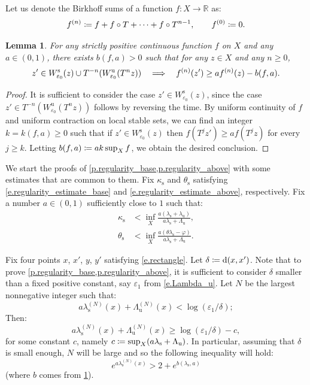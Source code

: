 \documentclass[JEP,XML,SOM,Unicode]{cedram}
\def\vcentcolon{\mathrel{\mathop\ordinarycolon}}
\providecommand\ordinarycolon{:}
\providecommand*\coloneqq{\vcentcolon\mathrel{\mkern-1.2mu}=}
\newcommand\implique{\mathchoice{\Longrightarrow}{\Rightarrow}{\Rightarrow}{\Rightarrow}}
\theoremstyle{plain}
\newtheorem{lemma}[theorem]{Lemma}
\theoremstyle{definition}
\newcommand{\RR}{\mathbb{R}}
\newcommand{\dd}{\mathrm{d}}
\newcommand{\uu}{\mathrm{u}}
\renewcommand{\ss}{\mathrm{s}}
\let\epsilon\varepsilon
\let\phi\varphi
\begin{document}
Let us denote the Birkhoff sums of a function $f \colon X \to \RR$ as:
\[
f^{(n)} \coloneqq f + f \circ T + \cdots + f \circ T^{n-1},
\qquad f^{(0)} \coloneqq 0.
\]

\begin{lemma}\label{l.loss}
For any strictly positive continuous function $f$ on $X$ and any $a \in (0,1)$, there exists $b(f,a)>0$ such that for any $z \in X$ and any $n \ge 0$,
\[
z' \in W^\ss_{\epsilon_0}(z) \cup T^{-n}(W^\uu_{\epsilon_0}(T^n z)) \quad \implique \quad
f^{(n)}(z') \ge a f^{(n)}(z) - b(f,a).
\]
\end{lemma}

\begin{proof}
It is sufficient to consider the case $z' \in W^\ss_{\epsilon_0}(z)$, since the case $z' \in T^{-n}(W^\uu_{\epsilon_0}(T^n z))$ follows by reversing the time.
By uniform continuity of $f$ and uniform contraction on local stable sets, we can find an integer $k = k(f,a) \ge 0$ such that if $z' \in W^\ss_{\epsilon_0}(z)$ then $f(T^j z') \ge a f(T^j z)$ for every $j \ge k$.
Letting $b(f,a) \coloneqq ak \sup_X f$, we obtain the desired conclusion.
\end{proof}

We start the proofs of \cref{p.regularity_base,p.regularity_above} with some estimates that are common to them.
Fix $\kappa_\ss$ and $\theta_\ss$ satisfying \eqref{e.regularity_estimate_base} and \eqref{e.regularity_estimate_above}, respectively.
Fix a number $a\in(0,1)$ sufficiently close to $1$ such that:
\begin{align}
\kappa_{\ss} &< \inf_{X} \frac{a (\lambda_\ss + \lambda_\uu)}{a \lambda_\ss + \Lambda_\uu},
\label{e.folga_base}
\\
\theta_{\ss} &< \inf_{X} \frac{a (\theta \lambda_\ss - \phi)}{a \lambda_\ss + \Lambda_\uu}.
\label{e.folga_above}
\end{align}

Fix four points $x$, $x'$, $y$, $y'$ satisfying \eqref{e.rectangle}.
Let $\delta \coloneqq \dd(x,x')$.
Note that to prove \cref{p.regularity_base,p.regularity_above}, it is sufficient to consider $\delta$ smaller than a fixed positive constant, say $\epsilon_1$ from \eqref{e.Lambda_u}.
Let $N$ be the largest nonnegative integer such that:
\begin{equation}\label{e.optimal}
a \lambda_\ss^{(N)}(x) + \Lambda_\uu^{(N)}(x) < \log(\epsilon_1/\delta) ;
\end{equation}
Then:
\begin{equation}\label{e.optimal_other_side}
a \lambda_\ss^{(N)}(x) + \Lambda_\uu^{(N)}(x) \ge \log(\epsilon_1/\delta) - c,
\end{equation}
for some constant $c$, namely $c \coloneqq \sup_X (a \lambda_\ss + \Lambda_\uu)$.
In particular, assuming that $\delta$ is small enough, $N$ will be large and so the following inequality will hold:
\begin{equation}\label{e.WLOG}
e^{a \lambda_\ss^{(N)}(x)} > 2 + e^{b(\lambda_\ss,a)}
\end{equation}
(where $b$ comes from \cref{l.loss}).
\end{document}
